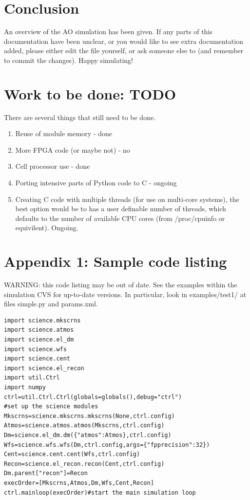 \documentclass{article}
\begin{document}
\section{Conclusion}
An overview of the AO simulation has been given.  If any parts of this
documentation have been unclear, or you would like to see extra
documentation added, please either edit the file yourself, or ask
someone else to (and remember to commit the changes).  Happy
simulating!

\section{Work to be done: TODO}
There are several things that still need to be done.
\begin{enumerate}
\item Reuse of module memory - done
\item More FPGA code (or maybe not) - no
\item Cell processor use - done
\item Porting intensive parts of Python code to C - ongoing
\item Creating C code with multiple threads (for use on multi-core
  systems), the best option would be to has a user definable number of
  threads, which defaults to the number of available CPU cores (from
  /proc/cpuinfo or equivilent).  Ongoing.
\end{enumerate}


\appendix
\section*{Appendix 1: Sample code listing}
\label{app:src}
WARNING: this code listing may be out of date.  See the examples
within the simulation CVS for up-to-date versions.  In particular,
look in examples/test1/ at files simple.py and params.xml.

\begin{verbatim}
import science.mkscrns
import science.atmos
import science.el_dm
import science.wfs
import science.cent
import science.el_recon
import util.Ctrl
import numpy
ctrl=util.Ctrl.Ctrl(globals=globals(),debug="ctrl")
#set up the science modules
Mkscrns=science.mkscrns.mkscrns(None,ctrl.config)
Atmos=science.atmos.atmos(Mkscrns,ctrl.config)
Dm=science.el_dm.dm({"atmos":Atmos},ctrl.config)
Wfs=science.wfs.wfs(Dm,ctrl.config,args={"fpprecision":32})
Cent=science.cent.cent(Wfs,ctrl.config)
Recon=science.el_recon.recon(Cent,ctrl.config)
Dm.parent["recon"]=Recon
execOrder=[Mkscrns,Atmos,Dm,Wfs,Cent,Recon]
ctrl.mainloop(execOrder)#start the main simulation loop
\end{verbatim}
\end{document}
